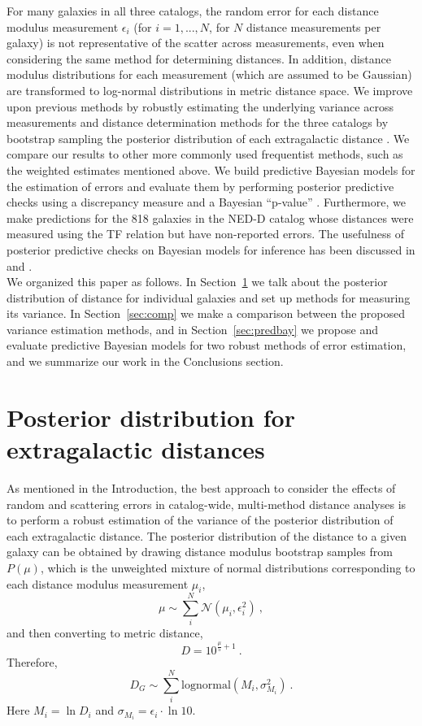 \documentclass[a4paper,fleqn,usenatbib]{mnras}
\begin{document}
For many galaxies in all three catalogs, the random error for each distance modulus measurement $\epsilon_i$ (for $i=1,...,N$, for $N$ distance measurements per galaxy) is not representative of the scatter across measurements, even when considering the same method for determining distances. In addition, distance modulus distributions for each measurement (which are assumed to be Gaussian) are transformed to log-normal distributions in metric distance space. We improve upon previous methods by robustly estimating the underlying variance across measurements and distance determination methods for the three catalogs by bootstrap sampling the posterior distribution of each extragalactic distance \citep{chaparro18}. We compare our results to other more commonly used frequentist methods, such as the weighted estimates mentioned above. We build predictive Bayesian models for the estimation of errors and evaluate them by performing posterior predictive checks using a discrepancy measure and a Bayesian ``p-value'' \citep{gelmanppd}. Furthermore, we make predictions for the 818 galaxies in the NED-D catalog whose distances were measured using the TF relation but have non-reported errors. The usefulness of posterior predictive checks on Bayesian models for inference has been discussed in \citet{gelman2003} and \citet{ppcinf}.\\

We organized this paper as follows. In Section~\ref{sec:post} we talk about the posterior distribution of distance for individual galaxies and set up methods for measuring its variance. In Section~\ref{sec:comp} we make a comparison between the proposed variance estimation methods, and in Section~\ref{sec:predbay} we propose and evaluate predictive Bayesian models for two robust methods of error estimation, and we summarize our work in the Conclusions section.

\section{Posterior distribution for extragalactic distances}
\label{sec:post} 
 
As mentioned in the Introduction, the best approach to consider the effects of random and scattering errors in catalog-wide, multi-method distance analyses is to perform a robust estimation of the variance of the posterior distribution of each extragalactic distance. The posterior distribution of the distance to a given galaxy can be obtained by drawing distance modulus bootstrap samples from $P(\mu)$, which is the unweighted mixture of normal distributions corresponding to each distance modulus measurement $\mu_i$,
\[\mu\sim\sum_i^N \mathcal{N}(\mu_i,\epsilon_i^2)\ ,\]
and then converting to metric distance,
\[D=10^{\frac{\mu}{5}+1}\ .\]
Therefore,
\[D_G\sim\sum_i^N\mathrm{lognormal}(M_i,\sigma_{M_i}^2)\ .\]
Here $M_i=\ln D_i$ and $\sigma_{M_i}=\epsilon_i\cdot\ln10$.\\
\end{document}
